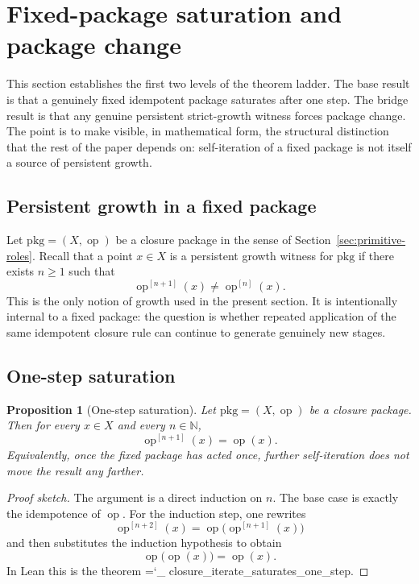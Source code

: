 \documentclass[11pt]{article}
\newtheorem{proposition}{Proposition}
\newcommand{\lid}[1]{{\small\ttfamily\hyphenchar\font=`\_ #1}}
\begin{document}
 \section{Fixed-package saturation and package change}\label{sec:fixed-package}

This section establishes the first two levels of the theorem ladder. The base result is that a genuinely fixed idempotent package saturates after one step. The bridge result is that any genuine persistent strict-growth witness forces package change. The point is to make visible, in mathematical form, the structural distinction that the rest of the paper depends on: self-iteration of a fixed package is not itself a source of persistent growth.

\subsection*{Persistent growth in a fixed package}

Let $\mathrm{pkg}=(X,\operatorname{op})$ be a closure package in the sense of Section~\ref{sec:primitive-roles}. Recall that a point $x\in X$ is a persistent growth witness for $\mathrm{pkg}$ if there exists $n\ge 1$ such that
\[
\operatorname{op}^{[n+1]}(x)\neq \operatorname{op}^{[n]}(x).
\]
This is the only notion of growth used in the present section. It is intentionally internal to a fixed package: the question is whether repeated application of the same idempotent closure rule can continue to generate genuinely new stages.

\subsection*{One-step saturation}

\begin{proposition}[One-step saturation]\label{prop:one-step-saturation}
Let \(\mathrm{pkg}=(X,\operatorname{op})\) be a closure package. Then for every \(x\in X\) and every \(n\in \mathbb{N}\),
\[
\operatorname{op}^{[n+1]}(x)=\operatorname{op}(x).
\]
Equivalently, once the fixed package has acted once, further self-iteration does not move the result any farther.
\end{proposition}

\begin{proof}[Proof sketch]
The argument is a direct induction on \(n\). The base case is exactly the idempotence of \(\operatorname{op}\). For the induction step, one rewrites
\[
\operatorname{op}^{[n+2]}(x)=\operatorname{op}\bigl(\operatorname{op}^{[n+1]}(x)\bigr)
\]
and then substitutes the induction hypothesis to obtain
\[
\operatorname{op}\bigl(\operatorname{op}(x)\bigr)=\operatorname{op}(x).
\]
In Lean this is the theorem \lid{closure\_iterate\_saturates\_one\_step}.
\end{proof}
\end{document}
